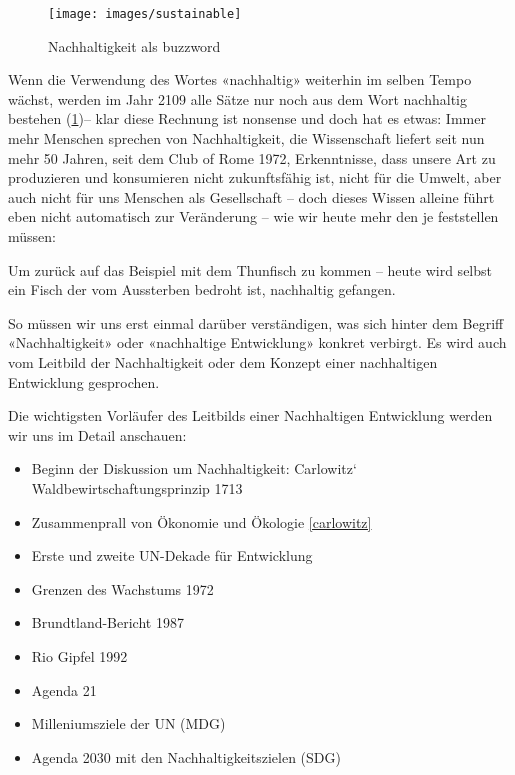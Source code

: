 \documentclass[
]{book}
\providecommand{\tightlist}{%
  \setlength{\itemsep}{0pt}\setlength{\parskip}{0pt}}
\begin{document}
\begin{figure}

{\centering \texttt{[image: images/sustainable]} 

}

\caption{Nachhaltigkeit als buzzword}\label{fig:sustainable}
\end{figure}

Wenn die Verwendung des Wortes «nachhaltig» weiterhin im selben Tempo wächst, werden im Jahr 2109 alle Sätze nur noch aus dem Wort nachhaltig bestehen (\ref{fig:sustainable})-- klar diese Rechnung ist nonsense und doch hat es etwas: Immer mehr Menschen sprechen von Nachhaltigkeit, die Wissenschaft liefert seit nun mehr 50 Jahren, seit dem Club of Rome 1972, Erkenntnisse, dass unsere Art zu produzieren und konsumieren nicht zukunftsfähig ist, nicht für die Umwelt, aber auch nicht für uns Menschen als Gesellschaft -- doch dieses Wissen alleine führt eben nicht automatisch zur Veränderung -- wie wir heute mehr den je feststellen müssen:

Um zurück auf das Beispiel mit dem Thunfisch zu kommen -- heute wird selbst ein Fisch der vom Aussterben bedroht ist, nachhaltig gefangen.

So müssen wir uns erst einmal darüber verständigen, was sich hinter dem Begriff «Nachhaltigkeit» oder «nachhaltige Entwicklung» konkret verbirgt. Es wird auch vom Leitbild der Nachhaltigkeit oder dem Konzept einer nachhaltigen Entwicklung gesprochen.

\begin{defbox}

Die wichtigsten Vorläufer des Leitbilds einer Nachhaltigen Entwicklung werden wir uns im Detail anschauen:

\begin{itemize}
\tightlist
\item
  Beginn der Diskussion um Nachhaltigkeit: Carlowitz` Waldbewirtschaftungsprinzip 1713
\item
  Zusammenprall von Ökonomie und Ökologie \ref{carlowitz}
\item
  Erste und zweite UN-Dekade für Entwicklung
\item
  Grenzen des Wachstums 1972
\item
  Brundtland-Bericht 1987
\item
  Rio Gipfel 1992
\item
  Agenda 21
\item
  Milleniumsziele der UN (MDG)
\item
  Agenda 2030 mit den Nachhaltigkeitszielen (SDG)
\end{itemize}

\end{defbox}
\end{document}
